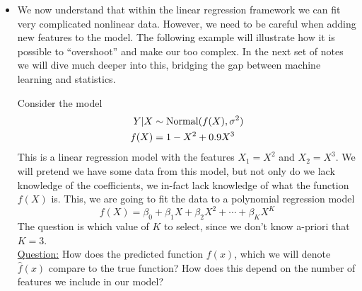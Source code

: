 \begin{itemize}
\item We now understand that within the linear regression framework we can fit very complicated nonlinear data. However, we need to be careful when adding new features to the model. The following example will illustrate how it is possible to ``overshoot'' and make our too complex. In the next set of notes we will dive much deeper into this, bridging the gap between machine learning and statistics. 
\begin{example}\label{ex:poly}
Consider the model 
\begin{align*}
 Y|X &\sim {\rm Normal}(f(X),\sigma^2)\\
 f(X) &= 1-X^2 + 0.9X^3
\end{align*}
This is a linear regression model with the features $X_1 = X^2$ and $X_2 = X^3$. 
We will pretend we have some data from this model, but not only do we lack knowledge of the coefficients, we in-fact lack knowledge of what the function $f(X)$ is. This, we are going to fit the data to a polynomial regression model
\begin{equation*}
f(X) = \beta_0 + \beta_1X + \beta_2X^2 + \cdots + \beta_KX^K
\end{equation*}
The question is which value of $K$ to select, since we don't know a-priori that $K=3$.  \\

\noindent
\underline{Question:} How does the predicted function $f(x)$, which we will denote $\hat{f}(x)$ compare to the true function? How does this depend on the number of features we include in our model? 
\end{example}
\end{itemize}






 






